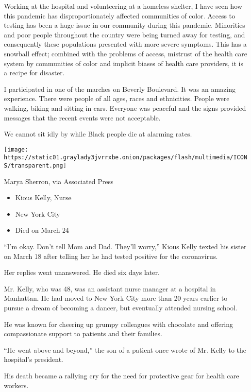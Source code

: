 Working at the hospital and volunteering at a homeless shelter, I have
seen how this pandemic has disproportionately affected communities of
color. Access to testing has been a huge issue in our community during
this pandemic. Minorities and poor people throughout the country were
being turned away for testing, and consequently these populations
presented with more severe symptoms. This has a snowball effect;
combined with the problems of access, mistrust of the health care system
by communities of color and implicit biases of health care providers, it
is a recipe for disaster.

I participated in one of the marches on Beverly Boulevard. It was an
amazing experience. There were people of all ages, races and
ethnicities. People were walking, biking and sitting in cars. Everyone
was peaceful and the signs provided messages that the recent events were
not acceptable.

We cannot sit idly by while Black people die at alarming rates.

\texttt{[image: https://static01.graylady3jvrrxbe.onion/packages/flash/multimedia/ICONS/transparent.png]}

Marya Sherron, via Associated Press

\begin{itemize}
\tightlist
\item
  Kious Kelly, Nurse
\item
  New York City
\item
  Died on March 24
\end{itemize}

``I'm okay. Don't tell Mom and Dad. They'll worry,'' Kious Kelly texted
his sister on March 18 after telling her he had tested positive for the
coronavirus.

Her replies went unanswered. He died six days later.

Mr. Kelly, who was 48, was an assistant nurse manager at a hospital in
Manhattan. He had moved to New York City more than 20 years earlier to
pursue a dream of becoming a dancer, but eventually attended nursing
school.

He was known for cheering up grumpy colleagues with chocolate and
offering compassionate support to patients and their families.

``He went above and beyond,'' the son of a patient once wrote of Mr.
Kelly to the hospital's president.

His death became a rallying cry for the need for protective gear for
health care workers.

